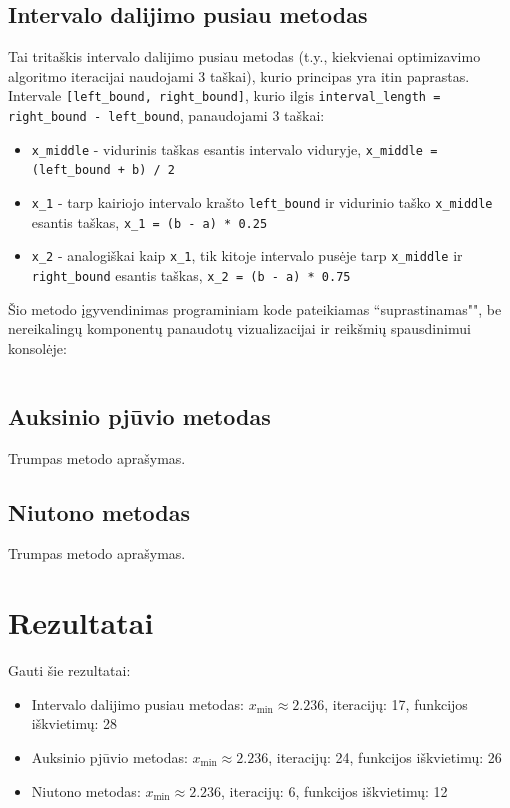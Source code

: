 \documentclass[lithuanian,a4paper,12pt]{article}
\newcommand{\mil}{\texttt}
\begin{document}
\subsection{Intervalo dalijimo pusiau metodas}
Tai tritaškis intervalo dalijimo pusiau metodas (t.y., kiekvienai optimizavimo algoritmo iteracijai naudojami 3 taškai), kurio principas yra itin paprastas. Intervale \mil{[left_bound, right_bound]}, kurio ilgis \mil{interval_length = right_bound - left_bound}, panaudojami 3 taškai:
\begin{itemize}
    \item \mil{x_middle} - vidurinis taškas esantis intervalo viduryje, \mil{x_{middle} = (left_bound + b) / 2}
    \item \mil{x_1} - tarp kairiojo intervalo krašto \mil{left_bound} ir vidurinio taško \mil{x_middle} esantis taškas, \mil{x_1 = (b - a) * 0.25}
    \item \mil{x_2} - analogiškai kaip \mil{x_1}, tik kitoje intervalo pusėje tarp \mil{x_middle} ir \mil{right_bound} esantis taškas, \mil{x_2 = (b - a) * 0.75}
\end{itemize}

Šio metodo įgyvendinimas programiniam kode pateikiamas ``suprastinamas"", be nereikalingų komponentų panaudotų vizualizacijai ir reikšmių spausdinimui konsolėje:

\begin{verbatim}

\end{verbatim}

\subsection{Auksinio pjūvio metodas}
Trumpas metodo aprašymas.

\subsection{Niutono metodas}
Trumpas metodo aprašymas.

\section{Rezultatai}
Gauti šie rezultatai:

\begin{itemize}
    \item Intervalo dalijimo pusiau metodas: 
        $x_{\min} \approx 2.236$, iteracijų: 17, funkcijos iškvietimų: 28
    \item Auksinio pjūvio metodas:
        $x_{\min} \approx 2.236$, iteracijų: 24, funkcijos iškvietimų: 26
    \item Niutono metodas:
        $x_{\min} \approx 2.236$, iteracijų: 6, funkcijos iškvietimų: 12
\end{itemize}
\end{document}
